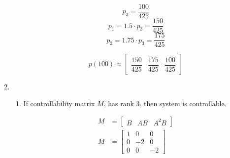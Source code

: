 \documentclass[12pt,a4paper, margin=1in]{article}
\begin{document}
\begin{enumerate}[label=\textbf{\arabic*.}]
\begin{enumerate}
                \begin{equation*}
                    p_3 = \frac{100}{425}
                \end{equation*}
                \begin{equation*}
                    p_1 = 1.5 \cdot p_3 = \frac{150}{425}
                \end{equation*}
                \begin{equation*}
                    p_2 = 1.75 \cdot p_3 = \frac{175}{425} 
                \end{equation*}

                \bigskip

                \begin{equation*}
                    p(100) \approx \begin{bmatrix}
                        \dfrac{150}{425} & \dfrac{175}{425} & \dfrac{100}{425}
                    \end{bmatrix}
                \end{equation*}
        \end{enumerate}
        
        
    \item %
        \begin{enumerate}
            \item 
                If controllability matrix $M$, has rank 3, then system is controllable.

                \begin{align*}
                    M &= \begin{bmatrix}
                        B & AB & A^2B
                    \end{bmatrix} \\
                    M &= \begin{bmatrix}
                        1 & 0 & 0 \\
                        0 & -2 & 0 \\
                        0 & 0 & -2
                    \end{bmatrix}
                \end{align*}
                

\end{enumerate}
\end{enumerate}
\end{document}
